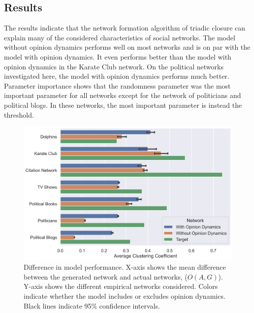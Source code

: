\documentclass{article}
\begin{document}
\subsection{Results}

The results indicate that the network formation algorithm of triadic closure can explain many of the considered characteristics of social networks. The model without opinion dynamics performs well on most networks and is on par with the model with opinion dynamics. It even performs better than the model with opinion dynamics in the Karate Club network. On the political networks investigated here, the model with opinion dynamics performs much better.
Parameter importance shows that the randomness parameter was the most important parameter for all networks except for the network of politicians and political blogs.  In these networks, the most important parameter is instead the threshold. 

\begin{figure}[H]
    \centering
    \includegraphics[width=.8\linewidth]{../plots/overall/Model_Evaluation_Average_Clustering.png}
  \caption{Difference in model performance. X-axis shows the mean difference between the generated network and actual networks, ($O(A, G)$). Y-axis shows the different empirical networks considered. Colors indicate whether the model includes or excludes opinion dynamics. Black lines indicate 95\% confidence intervals.}
  \label{fig:sfig1}
\end{figure}
\end{document}

